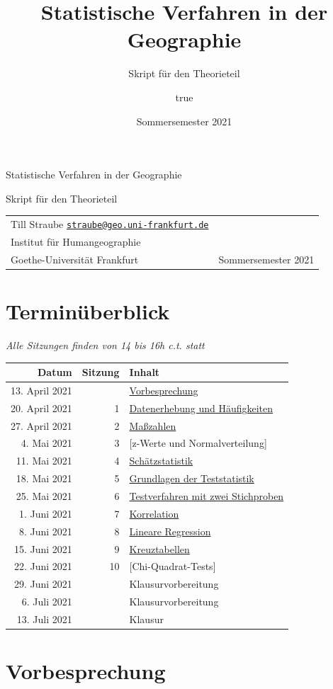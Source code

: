 \documentclass[
  11pt,
  ngerman,
  a4paper,
]{report}
\title{Statistische Verfahren in der Geographie}
\subtitle{Skript für den Theorieteil}
\author{true}
\date{Sommersemester 2021}
\makeatletter
\renewcommand{\maketitle}{
  \newpage
  \begingroup
    \setlength{\parindent}{0pt}
    \setlength{\parskip}{8pt}
    {\fontseries{b}\selectfont\Huge\raggedright{Statistische Verfahren in der Geographie}\par}
    {\fontseries{l}\LARGE\raggedright{Skript für den Theorieteil}\par}

    \vspace{1cm}
    
    \begin{tabularx}{\textwidth}{@{}X r}
                  Till Straube
        \newline \href{mailto:straube@geo.uni-frankfurt.de}{\nolinkurl{straube@geo.uni-frankfurt.de}}
                  \medskip\newline
          {\renewcommand\\{\newline}Institut für Humangeographie\\
Goethe-Universität Frankfurt}
         &
                    Sommersemester 2021
        \end{tabularx}
  \endgroup
  \vspace{1cm}
  \thispagestyle{plain}%
}
\makeatother
\begin{document}
\maketitle

{
\setcounter{tocdepth}{1}
\tableofcontents
}
\hypertarget{terminuxfcberblick}{%
\chapter*{Terminüberblick}\label{terminuxfcberblick}}

\emph{Alle Sitzungen finden von 14 bis 16h c.t. statt}

\begin{longtable}[]{@{}rrl@{}}
\toprule
Datum & Sitzung & Inhalt \\
\midrule
\endhead
13. April 2021 & & \protect\hyperlink{vorbesprechung}{Vorbesprechung} \\
20. April 2021 & 1 & \protect\hyperlink{datenerhebung-und-huxe4ufigkeiten}{Datenerhebung und Häufigkeiten} \\
27. April 2021 & 2 & \protect\hyperlink{mauxdfzahlen}{Maßzahlen} \\
4. Mai 2021 & 3 & {[}z-Werte und Normalverteilung{]} \\
11. Mai 2021 & 4 & \protect\hyperlink{schuxe4tzstatistik}{Schätzstatistik} \\
18. Mai 2021 & 5 & \protect\hyperlink{grundlagen-der-teststatistik}{Grundlagen der Teststatistik} \\
25. Mai 2021 & 6 & \protect\hyperlink{testverfahren-mit-zwei-stichproben}{Testverfahren mit zwei Stichproben} \\
1. Juni 2021 & 7 & \protect\hyperlink{korrelation}{Korrelation} \\
8. Juni 2021 & 8 & \protect\hyperlink{lineare-regression}{Lineare Regression} \\
15. Juni 2021 & 9 & \protect\hyperlink{kreuztabellen}{Kreuztabellen} \\
22. Juni 2021 & 10 & {[}Chi-Quadrat-Tests{]} \\
29. Juni 2021 & & Klausurvorbereitung \\
6. Juli 2021 & & Klausurvorbereitung \\
13. Juli 2021 & & Klausur \\
\bottomrule
\end{longtable}

\hypertarget{vorbesprechung}{%
\chapter*{Vorbesprechung}\label{vorbesprechung}}
\end{document}
